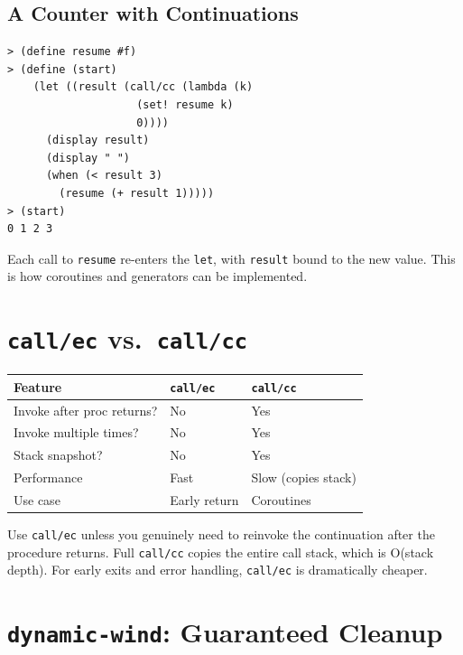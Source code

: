 \subsection{A Counter with Continuations}

\begin{lstlisting}[style=repl]
> (define resume #f)
> (define (start)
    (let ((result (call/cc (lambda (k)
                    (set! resume k)
                    0))))
      (display result)
      (display " ")
      (when (< result 3)
        (resume (+ result 1)))))
> (start)
0 1 2 3
\end{lstlisting}

Each call to \texttt{resume} re-enters the \texttt{let}, with \texttt{result} bound to the new value. This is how coroutines and generators can be implemented.

\section{\texttt{call/ec} vs.\ \texttt{call/cc}}

\begin{center}
\begin{tabular}{lll}
\textbf{Feature} & \textbf{\texttt{call/ec}} & \textbf{\texttt{call/cc}} \\
\hline
Invoke after proc returns? & No & Yes \\
Invoke multiple times? & No & Yes \\
Stack snapshot? & No & Yes \\
Performance & Fast & Slow (copies stack) \\
Use case & Early return & Coroutines \\
\end{tabular}
\end{center}

\begin{warning}
Use \texttt{call/ec} unless you genuinely need to reinvoke the continuation after the procedure returns. Full \texttt{call/cc} copies the entire call stack, which is O(stack depth). For early exits and error handling, \texttt{call/ec} is dramatically cheaper.
\end{warning}

\section{\texttt{dynamic-wind}: Guaranteed Cleanup}

